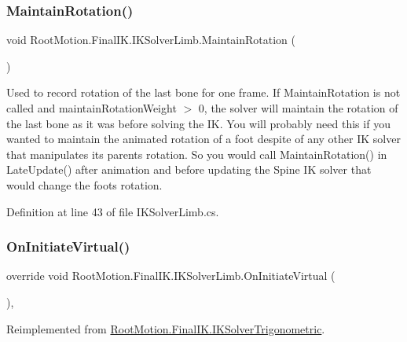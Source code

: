 \subsubsection{\texorpdfstring{Maintain\+Rotation()}{MaintainRotation()}}
{\footnotesize\ttfamily void Root\+Motion.\+Final\+I\+K.\+I\+K\+Solver\+Limb.\+Maintain\+Rotation (\begin{DoxyParamCaption}{ }\end{DoxyParamCaption})}



Used to record rotation of the last bone for one frame. If Maintain\+Rotation is not called and maintain\+Rotation\+Weight $>$ 0, the solver will maintain the rotation of the last bone as it was before solving the IK. You will probably need this if you wanted to maintain the animated rotation of a foot despite of any other IK solver that manipulates it\textquotesingle{}s parents\textquotesingle{} rotation. So you would call Maintain\+Rotation() in Late\+Update() after animation and before updating the Spine IK solver that would change the foot\textquotesingle{}s rotation. 



Definition at line 43 of file I\+K\+Solver\+Limb.\+cs.

\mbox{\label{class_root_motion_1_1_final_i_k_1_1_i_k_solver_limb_ad7b356de1a54f7ce06b6c35faef32c69}} 
\subsubsection{\texorpdfstring{On\+Initiate\+Virtual()}{OnInitiateVirtual()}}
{\footnotesize\ttfamily override void Root\+Motion.\+Final\+I\+K.\+I\+K\+Solver\+Limb.\+On\+Initiate\+Virtual (\begin{DoxyParamCaption}{ }\end{DoxyParamCaption})\hspace{0.3cm}{\ttfamily [protected]}, {\ttfamily [virtual]}}



Reimplemented from \mbox{\hyperlink{class_root_motion_1_1_final_i_k_1_1_i_k_solver_trigonometric_af11d3885dee47e31be9f069355d0ce67}{Root\+Motion.\+Final\+I\+K.\+I\+K\+Solver\+Trigonometric}}.



